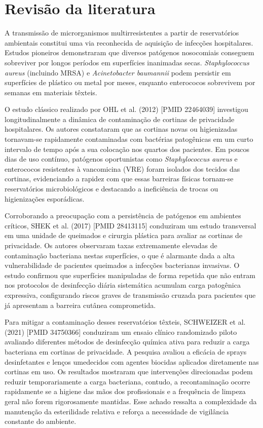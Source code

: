 \documentclass[12pt,a4paper]{article}
\begin{document}
\section{Revisão da literatura}
A transmissão de microrganismos multirresistentes a partir de reservatórios ambientais constitui uma via reconhecida de aquisição de infecções hospitalares. Estudos pioneiros demonstraram que diversos patógenos nosocomiais conseguem sobreviver por longos períodos em superfícies inanimadas secas. \textit{Staphylococcus aureus} (incluindo MRSA) e \textit{Acinetobacter baumannii} podem persistir em superfícies de plástico ou metal por meses, enquanto enterococos sobrevivem por semanas em materiais têxteis.

O estudo clássico realizado por OHL et al. (2012) [PMID 22464039] investigou longitudinalmente a dinâmica de contaminação de cortinas de privacidade hospitalares. Os autores constataram que as cortinas novas ou higienizadas tornavam-se rapidamente contaminadas com bactérias patogênicas em um curto intervalo de tempo após a sua colocação nos quartos dos pacientes. Em poucos dias de uso contínuo, patógenos oportunistas como \textit{Staphylococcus aureus} e enterococos resistentes à vancomicina (VRE) foram isolados dos tecidos das cortinas, evidenciando a rapidez com que essas barreiras físicas tornam-se reservatórios microbiológicos e destacando a ineficiência de trocas ou higienizações esporádicas.

Corroborando a preocupação com a persistência de patógenos em ambientes críticos, SHEK et al. (2017) [PMID 28413115] conduziram um estudo transversal em uma unidade de queimados e cirurgia plástica para avaliar as cortinas de privacidade. Os autores observaram taxas extremamente elevadas de contaminação bacteriana nestas superfícies, o que é alarmante dada a alta vulnerabilidade de pacientes queimados a infecções bacterianas invasivas. O estudo confirmou que superfícies manipuladas de forma repetida que não entram nos protocolos de desinfecção diária sistemática acumulam carga patogênica expressiva, configurando riscos graves de transmissão cruzada para pacientes que já apresentam a barreira cutânea comprometida.

Para mitigar a contaminação desses reservatórios têxteis, SCHWEIZER et al. (2021) [PMID 34750366] conduziram um ensaio clínico randomizado piloto avaliando diferentes métodos de desinfecção química ativa para reduzir a carga bacteriana em cortinas de privacidade. A pesquisa avaliou a eficácia de sprays desinfetantes e lenços umedecidos com agentes biocidas aplicados diretamente nas cortinas em uso. Os resultados mostraram que intervenções direcionadas podem reduzir temporariamente a carga bacteriana, contudo, a recontaminação ocorre rapidamente se a higiene das mãos dos profissionais e a frequência de limpeza geral não forem rigorosamente mantidas. Esse achado ressalta a complexidade da manutenção da esterilidade relativa e reforça a necessidade de vigilância constante do ambiente.
\end{document}
